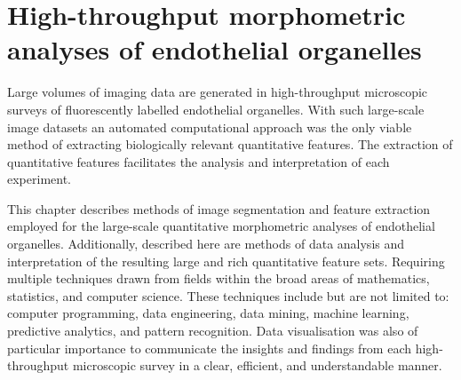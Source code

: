 \chapter{High-throughput morphometric analyses of endothelial organelles}
\label{endothelial_morphometry}
\ifpdf
	\graphicspath{{chapter_2/figs/}}
\fi


Large volumes of imaging data are generated in high-throughput microscopic surveys of fluorescently labelled endothelial organelles. With such large-scale image datasets an automated computational approach was the only viable method of extracting biologically relevant quantitative features. The extraction of quantitative features facilitates the analysis and interpretation of each experiment.

This chapter describes methods of image segmentation and feature extraction employed for the large-scale quantitative morphometric analyses of endothelial organelles. Additionally, described here are methods of data analysis and interpretation of the resulting large and rich quantitative feature sets. Requiring multiple techniques drawn from fields within the broad areas of mathematics, statistics, and computer science. These techniques include but are not limited to: computer programming, data engineering, data mining, machine learning, predictive analytics, and pattern recognition. Data visualisation was also of particular importance to communicate the insights and findings from each high-throughput microscopic survey in a clear, efficient, and understandable manner.

